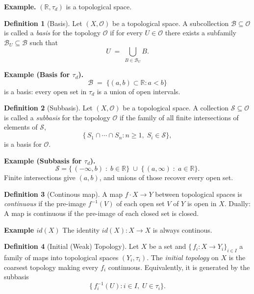\documentclass[11pt,a4paper]{article}
\theoremstyle{definition}
\newtheorem{definition}{Definition}[section]
\theoremstyle{plain}
\theoremstyle{remark}
\newcommand{\R}{\mathbb{R}}
\begin{document}
\noindent\textbf{Example.}
\((\R,\tau_d)\) is a topological space.

\begin{definition}[Basis]
Let \((X,\mathcal O)\) be a topological space.  A subcollection \(\mathcal B \subseteq \mathcal O\) is called a \emph{basis} for the topology \(\mathcal O\) if for every \(U \in \mathcal O\) there exists a subfamily \(\mathcal B_U \subseteq \mathcal B\) such that
\[
  U \;=\; \bigcup_{B \in \mathcal B_U} B.
\]
\end{definition}

\noindent\textbf{Example (Basis for \(\tau_d\)).}
\[
  \mathcal B \;=\;\{(a,b)\subset\R : a<b\}
\]
is a basis: every open set in \(\tau_d\) is a union of open intervals.

\begin{definition}[Subbasis]
Let \((X,\mathcal O)\) be a topological space.  A collection \(\mathcal S \subseteq \mathcal O\) is called a \emph{subbasis} for the topology \(\mathcal O\) if the family of all finite intersections of elements of \(\mathcal S\),
\[
  \bigl\{\,S_{1}\cap\cdots\cap S_{n} : n\ge1,\;S_{i}\in\mathcal S\bigr\},
\]
is a basis for \(\mathcal O\).
\end{definition}

\noindent\textbf{Example (Subbasis for \(\tau_d\)).}
\[
  \mathcal S
  = \{\,(-\infty,b)\;:\;b\in\R\}\;\cup\;\{\, (a,\infty)\;:\;a\in\R\}.
\]
Finite intersections give \((a,b)\), and unions of those recover every open set.

\begin{definition}[Continous map] 
  A map $f \cdot X \to Y$ between topological spaces is \emph{continuous} if the pre-image $f^{-1}(V)$ of each open set $V$ of $Y$ is open in $X$. 
  Dually: A map is continuous if the pre-image of each closed set is closed.   
\end{definition}

\noindent\textbf{Example $id(X)$} The identity $id(X) \colon X \to X$ is always continous. 

\begin{definition}[Initial (Weak) Topology]
Let \(X\) be a set and \(\{\,f_i:X\to Y_i\}_{i\in I}\) a family of maps into topological spaces \((Y_i,\tau_i)\).  
The {\it initial topology} on \(X\) is the coarsest topology making every \(f_i\) continuous.  Equivalently, it is generated by the subbasis
\[
  \{\,f_i^{-1}(U) : i\in I,\;U\in\tau_i\}.
\]
\end{definition}
\end{document}
